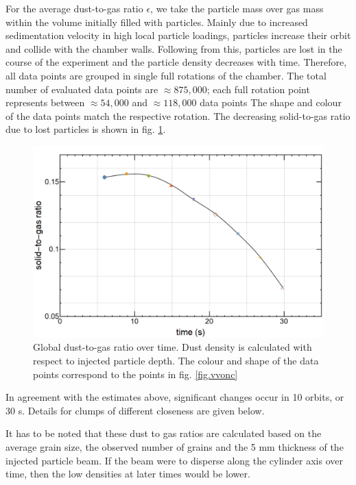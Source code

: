 For the average dust-to-gas ratio $\epsilon$, we take the particle mass over gas mass within the volume initially filled with particles. 
{Mainly due to increased sedimentation velocity in high local particle loadings, particles increase their orbit and collide} with the chamber walls. {Following from this, particles are lost in the course of the experiment and} the particle density decreases with time. {Therefore, all data points are {grouped in} single full rotations of the chamber.
{The total number of evaluated data points are $\approx\!\!875,000$; each full rotation point represents between $\approx\!\!54,000$ and $\approx\!\!118,000$  data points}
The shape and colour of the data points match the respective rotation.}
{The decreasing solid-to-gas ratio due to lost particles} is shown in fig. \ref{fig.dtog}.
\begin{figure}[h]
\includegraphics[width=\columnwidth]{density2.pdf}
    \caption{\label{fig.dtog}Global dust-to-gas ratio over time. Dust density is calculated with respect to injected particle depth. {The colour and shape of the data points correspond to the points in fig. \ref{fig.vvonc} }}
\end{figure}
In agreement with the estimates above, significant changes occur in 10 orbits, or 30 s. Details for clumps of different closeness are given below.

It has to be noted that these dust to gas ratios are calculated based on the average grain size, the observed number of grains and the 5 mm thickness of the injected particle beam.
If the beam were to disperse along the cylinder axis over time, then the low densities at later times would be lower. 






